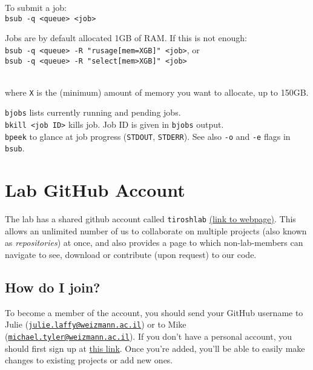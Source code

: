 \documentclass[
]{book}
\begin{document}
To submit a job:\\
\texttt{bsub\ -q\ \textless{}queue\textgreater{}\ \textless{}job\textgreater{}}

Jobs are by default allocated 1GB of RAM. If this is not enough:\\
\texttt{bsub\ -q\ \textless{}queue\textgreater{}\ -R\ "rusage{[}mem=XGB{]}"\ \textless{}job\textgreater{}}, or\\
\texttt{bsub\ -q\ \textless{}queue\textgreater{}\ -R\ "select{[}mem\textgreater{}XGB{]}"\ \textless{}job\textgreater{}}\strut \\
where \texttt{X} is the (minimum) amount of memory you want to allocate, up to 150GB.

\texttt{bjobs} lists currently running and pending jobs.\\
\texttt{bkill\ \textless{}job\ ID\textgreater{}} kills job. Job ID is given in \texttt{bjobs} output.\\
\texttt{bpeek} to glance at job progress (\texttt{STDOUT}, \texttt{STDERR}). See also \texttt{-o} and \texttt{-e} flags in \texttt{bsub}.

\hypertarget{labGitHub}{%
\chapter{Lab GitHub Account}\label{labGitHub}}

The lab has a shared github account called \texttt{tiroshlab} \href{https://github.com/tiroshlab}{(link to webpage)}. This allows an unlimited number of us to collaborate on multiple projects (also known as \emph{repositories}) at once, and also provides a page to which non-lab-members can navigate to see, download or contribute (upon request) to our code.

\hypertarget{how-do-i-join}{%
\section{How do I join?}\label{how-do-i-join}}

To become a member of the account, you should send your GitHub username to Julie (\href{mailto:julie.laffy@weizmann.ac.il}{\nolinkurl{julie.laffy@weizmann.ac.il}}) or to Mike (\href{mailto:michael.tyler@weizmann.ac.il}{\nolinkurl{michael.tyler@weizmann.ac.il}}). If you don't have a personal account, you should first sign up at \href{https://github.com/signup}{this link}. Once you're added, you'll be able to easily make changes to existing projects or add new ones.
\end{document}
